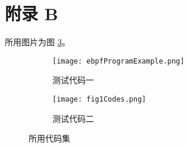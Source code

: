 \section*{附录 B}
    所用图片为图 \ref{fig4}。
    \begin{figure}[htp!]
        \centering
        \begin{subfigure}{0.3\linewidth}
            \texttt{[image: ebpfProgramExample.png]} %
            \caption{测试代码一}
            \label{f3son1}
        \end{subfigure} 
        \begin{subfigure}{0.3\linewidth}
            \texttt{[image: fig1Codes.png]} %
            \caption{测试代码二}
            \label{f3son2}
        \end{subfigure}
        \caption{所用代码集}
        \label{fig4}
    \end{figure}

